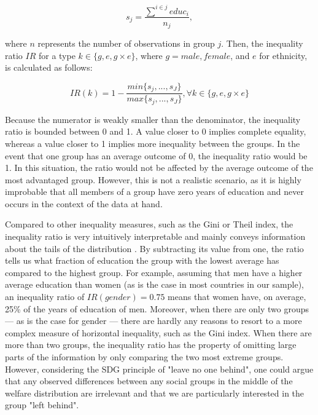 \begin{equation}
    s_{j}= \frac{\sum^{i \in j} educ_i}{n_j},
\end{equation}

where $n$ represents the number of observations in group $j$. Then, the inequality ratio $IR$ for a type $k\in\{g, e, g\times e\}$, where $g= male, female$, and $e$ for ethnicity, is calculated as follows:

\begin{equation}
    IR(k) = 1- \frac{min\{s_j,...,s_J\}}{max\{s_j,...,s_J\}}, \forall k\in\{g, e, g \times e\}
\end{equation}

Because the numerator is weakly smaller than the denominator, the inequality ratio is bounded between 0 and 1. A value closer to 0 implies complete equality, whereas a value closer to 1 implies more inequality between the groups. In the event that one group has an average outcome of 0, the inequality ratio would be 1. In this situation, the ratio would not be affected by the average outcome of the most advantaged group. However, this is not a realistic scenario, as it is highly improbable that all members of a group have zero years of education and never occurs in the context of the data at hand.

Compared to other inequality measures, such as the Gini or Theil index, the inequality ratio is very intuitively interpretable and mainly conveys information about the tails of the distribution \citep{Conceicao2000, Cobham2013}. By subtracting its value from one, the ratio tells us what fraction of education the group with the lowest average has compared to the highest group. For example, assuming that men have a higher average education than women (as is the case in most countries in our sample), an inequality ratio of $IR(gender)=0.75$ means that women have, on average, 25\% of the years of education of men. Moreover, when there are only two groups --- as is the case for gender --- there are hardly any reasons to resort to a more complex measure of horizontal inequality, such as the Gini index. When there are more than two groups, the inequality ratio has the property of omitting large parts of the information by only comparing the two most extreme groups. However, considering the SDG principle of "leave no one behind", one could argue that any observed differences between any social groups in the middle of the welfare distribution are irrelevant and that we are particularly interested in the group "left behind". 


